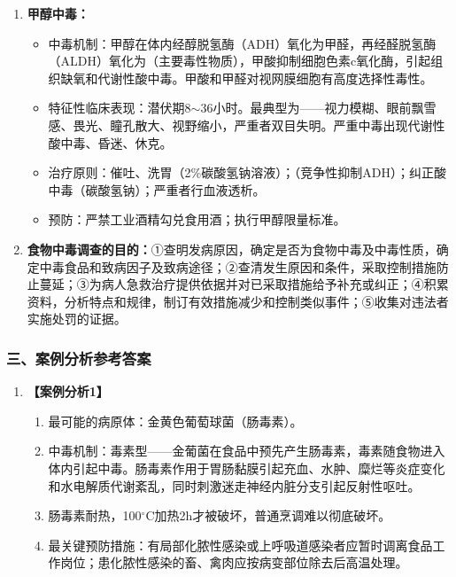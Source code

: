 {\begin{enumerate}[leftmargin=*, itemsep=4pt]
    \item \textbf{甲醇中毒：}
    \begin{itemize}[leftmargin=*]
        \item 中毒机制：甲醇在体内经醇脱氢酶（ADH）氧化为甲醛，再经醛脱氢酶（ALDH）氧化为（主要毒性物质），甲酸抑制细胞色素c氧化酶，引起组织缺氧和代谢性酸中毒。甲酸和甲醛对视网膜细胞有高度选择性毒性。
        \item 特征性临床表现：潜伏期8$\sim$36小时。最典型为——视力模糊、眼前飘雪感、畏光、瞳孔散大、视野缩小，严重者双目失明。严重中毒出现代谢性酸中毒、昏迷、休克。
        \item 治疗原则：催吐、洗胃（2\%碳酸氢钠溶液）；（竞争性抑制ADH）；纠正酸中毒（碳酸氢钠）；严重者行血液透析。
        \item 预防：严禁工业酒精勾兑食用酒；执行甲醇限量标准。
    \end{itemize}

    \item \textbf{食物中毒调查的目的：}①查明发病原因，确定是否为食物中毒及中毒性质，确定中毒食品和致病因子及致病途径；②查清发生原因和条件，采取控制措施防止蔓延；③为病人急救治疗提供依据并对已采取措施给予补充或纠正；④积累资料，分析特点和规律，制订有效措施减少和控制类似事件；⑤收集对违法者实施处罚的证据。
\end{enumerate}

\subsubsection*{三、案例分析参考答案}
\begin{enumerate}[leftmargin=*]
    \item \textbf{【案例分析1】}
    \begin{enumerate}[leftmargin=*]
        \item 最可能的病原体：金黄色葡萄球菌（肠毒素）。
        \item 中毒机制：毒素型——金葡菌在食品中预先产生肠毒素，毒素随食物进入体内引起中毒。肠毒素作用于胃肠黏膜引起充血、水肿、糜烂等炎症变化和水电解质代谢紊乱，同时刺激迷走神经内脏分支引起反射性呕吐。
        \item 肠毒素耐热，100$^\circ$C加热2h才被破坏，普通烹调难以彻底破坏。
        \item 最关键预防措施：有局部化脓性感染或上呼吸道感染者应暂时调离食品工作岗位；患化脓性感染的畜、禽肉应按病变部位除去后高温处理。
    \end{enumerate}


\end{enumerate}}
